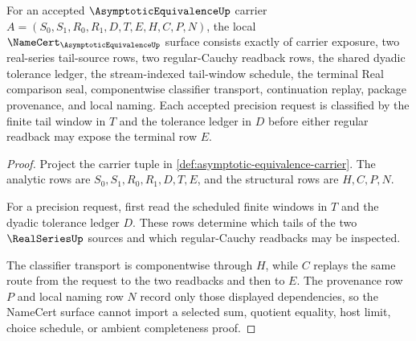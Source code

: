 \begin{theorem}
\label{thm:asymptotic-equivalence-namecert-obligations}
For an accepted $\AsymptoticEquivalenceUp$ carrier $A=(S_0,S_1,R_0,R_1,D,T,E,H,C,P,N)$, the local $\NameCert_{\AsymptoticEquivalenceUp}$ surface consists exactly of carrier exposure, two real-series tail-source rows, two regular-Cauchy readback rows, the shared dyadic tolerance ledger, the stream-indexed tail-window schedule, the terminal Real comparison seal, componentwise classifier transport, continuation replay, package provenance, and local naming. Each accepted precision request is classified by the finite tail window in $T$ and the tolerance ledger in $D$ before either regular readback may expose the terminal row $E$.
\end{theorem}
\begin{proof}
Project the carrier tuple in \autoref{def:asymptotic-equivalence-carrier}. The analytic rows are $S_0,S_1,R_0,R_1,D,T,E$, and the structural rows are $H,C,P,N$.

For a precision request, first read the scheduled finite windows in $T$ and the dyadic tolerance ledger $D$. These rows determine which tails of the two $\RealSeriesUp$ sources and which regular-Cauchy readbacks may be inspected.

The classifier transport is componentwise through $H$, while $C$ replays the same route from the request to the two readbacks and then to $E$. The provenance row $P$ and local naming row $N$ record only those displayed dependencies, so the NameCert surface cannot import a selected sum, quotient equality, host limit, choice schedule, or ambient completeness proof.
\end{proof}

